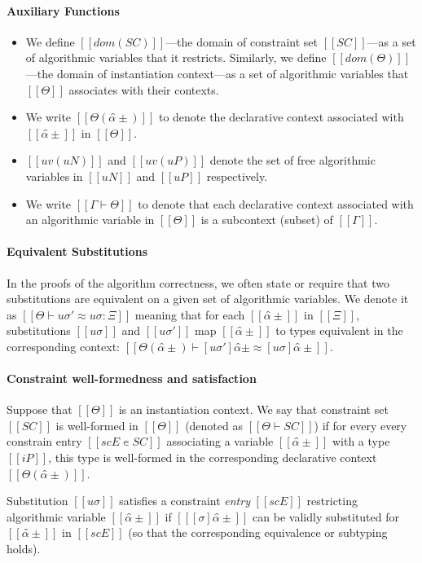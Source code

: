 \paragraph{Auxiliary Functions}
\begin{itemize}
  \item
    We define $[[dom(SC)]]$---the domain of constraint set $[[SC]]$---as a set of
    algorithmic variables that it restricts. Similarly, we define $[[dom(Θ)]]$---the
    domain of instantiation context---as a set of algorithmic variables that
    $[[Θ]]$ associates with their contexts.  
  \item We write $[[Θ(α̂±)]]$ to denote the
    declarative context associated with $[[α̂±]]$ in $[[Θ]]$. 
  \item $[[uv(uN)]]$ and $[[uv(uP)]]$ denote the set of free algorithmic variables in $[[uN]]$ and
    $[[uP]]$ respectively.
  \item We write $[[Γ ⊢ Θ]]$ to denote that each
    declarative context associated with an algorithmic variable in $[[Θ]]$ is 
    a subcontext (subset) of $[[Γ]]$.
\end{itemize}

\paragraph{Equivalent Substitutions}
In the proofs of the algorithm correctness, 
we often state or require that two substitutions are equivalent
on a given set of algorithmic variables.
We denote it as $[[Θ ⊢ uσ' ≈ uσ : Ξ]]$ meaning that
for each $[[α̂±]]$ in $[[Ξ]]$, substitutions $[[uσ]]$ and $[[uσ']]$
map $[[α̂±]]$ to types equivalent in the corresponding context:
$[[ Θ(α̂±) ⊢ [uσ']α̂± ≈ [uσ]α̂± ]]$.



\paragraph{Constraint well-formedness and satisfaction}
Suppose that $[[Θ]]$ is an instantiation context. 
We say that constraint set $[[SC]]$ is well-formed in $[[Θ]]$ 
(denoted as $[[Θ ⊢ SC]]$) 
if for every every constrain entry $[[scE ∊ SC]]$
associating a variable $[[α̂±]]$ with a type $[[iP]]$,
this type is well-formed in the corresponding declarative context $[[Θ(α̂±)]]$.

Substitution $[[uσ]]$ satisfies a constraint \emph{entry} $[[scE]]$ restricting
algorithmic variable $[[α̂±]]$ if
$[[ [σ]α̂± ]]$ can be validly substituted for $[[α̂±]]$ in $[[scE]]$ 
(so that the corresponding equivalence or subtyping holds).

